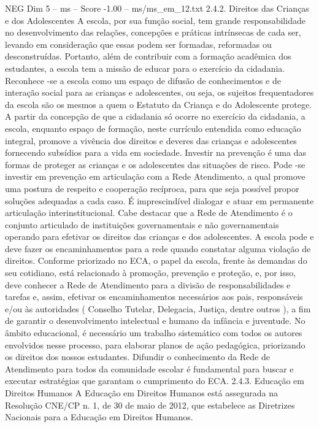 \begin{textsample}{NEG Dim 5 – ms – Score -1.00 – ms/ms\_em\_12.txt}  \label{ex:f5_neg_076}
2.4.2.
Direitos das Crianças e dos Adolescentes A escola, por sua função social, tem grande responsabilidade no desenvolvimento das relações, concepções e práticas intrínsecas de cada ser, levando em consideração que essas podem ser formadas, reformadas ou desconstruídas.
Portanto, além de contribuir com a formação acadêmica dos estudantes, a escola tem a missão de educar para o exercício da cidadania.
Reconhece -se a escola como um espaço de difusão de conhecimentos e de interação social para as crianças e adolescentes, ou seja, os sujeitos frequentadores da escola são os mesmos a quem o Estatuto da Criança e do Adolescente protege.
A partir da concepção de que a cidadania só ocorre no exercício da cidadania, a escola, enquanto espaço de formação, neste currículo entendida como educação integral, promove a vivência dos direitos e deveres das crianças e adolescentes fornecendo subsídios para a vida em sociedade.
Investir na prevenção é uma das formas de proteger as crianças e os adolescentes das situações de risco.
Pode -se investir em prevenção em articulação com a Rede Atendimento, a qual promove uma postura de respeito e cooperação recíproca, para que seja possível propor soluções adequadas a cada caso.
É imprescindível dialogar e atuar em permanente articulação interinstitucional.
Cabe destacar que a Rede de Atendimento é o conjunto articulado de instituições governamentais e não governamentais operando para efetivar os direitos das crianças e dos adolescentes.
A escola pode e deve fazer os encaminhamentos para a rede quando constatar alguma violação de direitos.
Conforme priorizado no ECA, o papel da escola, frente às demandas do seu cotidiano, está relacionado à promoção, prevenção e proteção, e, por isso, deve conhecer a Rede de Atendimento para a divisão de responsabilidades e tarefas e, assim, efetivar os encaminhamentos necessários aos pais, responsáveis e/ou às autoridades ( Conselho Tutelar, Delegacia, Justiça, dentre outros ), a fim de garantir o desenvolvimento intelectual e humano da infância e juventude.
No âmbito educacional, é necessário um trabalho sistemático com todos os autores envolvidos nesse processo, para elaborar planos de ação pedagógica, priorizando os direitos dos nossos estudantes.
Difundir o conhecimento da Rede de Atendimento para todos da comunidade escolar é fundamental para buscar e executar estratégias que garantam o cumprimento do ECA. 2.4.3.
Educação em Direitos Humanos A Educação em Direitos Humanos está assegurada na Resolução CNE/CP n. 1, de 30 de maio de 2012, que estabelece as Diretrizes Nacionais para a Educação em Direitos Humanos.

\end{textsample}
